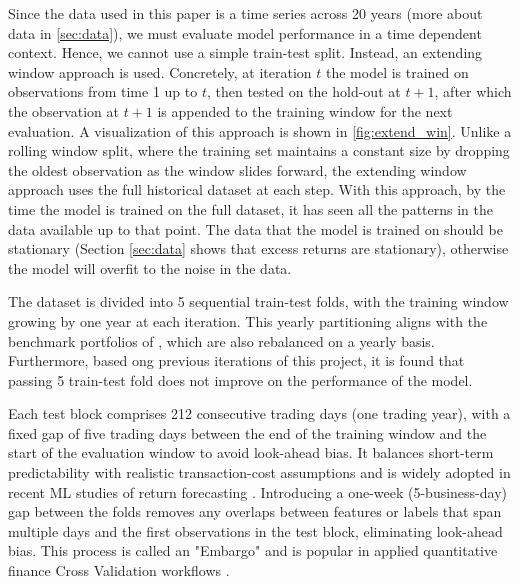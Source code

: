 Since the data used in this paper is a time series across 20 years (more about data in \ref{sec:data}), we must evaluate model performance in a time dependent context. Hence, we cannot use a simple train-test split. Instead, an extending window approach is used. Concretely, at iteration $t$ the model is trained on observations from time 1 up to $t$, then tested on the hold-out at $t+1$, after which the observation at $t+1$ is appended to the training window for the next evaluation. A visualization of this approach is shown in \ref{fig:extend_win}. Unlike a rolling window split, where the training set maintains a constant size by dropping the oldest observation as the window slides forward, the extending window approach uses the full historical dataset at each step. With this approach, by the time the model is trained on the full dataset, it has seen all the patterns in the data available up to that point. The data that the model is trained on should be stationary (Section \ref{sec:data} shows that excess returns are stationary), otherwise the model will overfit to the noise in the data.

The dataset is divided into 5 sequential train-test folds, with the training window growing by one year at each iteration. This yearly partitioning aligns with the benchmark portfolios of , which are also rebalanced on a yearly basis. Furthermore, based ong previous iterations of this project, it is found that passing 5 train-test fold does not improve on the performance of the model. 

Each test block comprises 212 consecutive trading days (one trading year), with a fixed gap of five trading days between the end of the training window and the start of the evaluation window to avoid look-ahead bias. It balances short-term predictability with realistic transaction-cost assumptions and is widely adopted in recent ML studies of return forecasting \cite{htun_2024}. Introducing a one-week (5-business-day) gap between the folds removes any overlaps between features or labels that span multiple days and the first observations in the test block, eliminating look-ahead bias. This process is called an "Embargo" and is popular in applied quantitative finance Cross Validation workflows \cite{embargo_2020}. %



